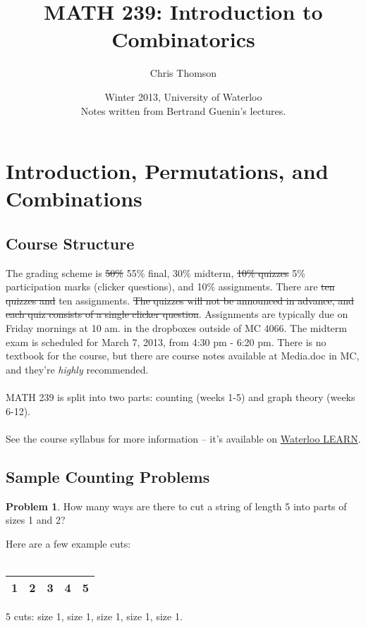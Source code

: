 \documentclass[]{article}
\theoremstyle{definition}
\newtheorem{problem}{Problem}[section]
\newcommand{\lecture}[1]{\marginpar{{\footnotesize $\leftarrow$ \underline{#1}}}}
\begin{document}
	\let\ref\Cref
	\title{\bf{MATH 239: Introduction to Combinatorics}}
	\date{Winter 2013, University of Waterloo \\ \center Notes written from Bertrand Guenin's lectures.}
	\author{Chris Thomson}
	\maketitle
	\newpage
	\tableofcontents
	\newpage
	
	\section{Introduction, Permutations, and Combinations} \lecture{January 7, 2013}
		\subsection{Course Structure}
			The grading scheme is \st{50\%} 55\% final, 30\% midterm, \st{10\% quizzes} 5\% participation marks (clicker questions), and 10\% assignments. There are \st{ten quizzes and} ten assignments. \st{The quizzes will not be announced in advance, and each quiz consists of a single clicker question}. Assignments are typically due on Friday mornings at 10 am. in the dropboxes outside of MC 4066. The midterm exam is scheduled for March 7, 2013, from 4:30 pm - 6:20 pm. There is no textbook for the course, but there are course notes available at Media.doc in MC, and they're \emph{highly} recommended.
			\\ \\
			MATH 239 is split into two parts: counting (weeks 1-5) and graph theory (weeks 6-12).
			\\ \\
			See the course syllabus for more information -- it's available on \href{https://learn.uwaterloo.ca/}{Waterloo LEARN}.

		\subsection{Sample Counting Problems}
			\begin{problem}
				How many ways are there to cut a string of length 5 into parts of sizes 1 and 2?
			\end{problem}
		
			Here are a few example cuts:
			\\ \\
			\begin{tabular}{|c|c|c|c|c|}
				\hline
				1 & 2 & 3 & 4 & 5 \\
				\hline
			\end{tabular}
			5 cuts: size 1, size 1, size 1, size 1, size 1.
\end{document}
